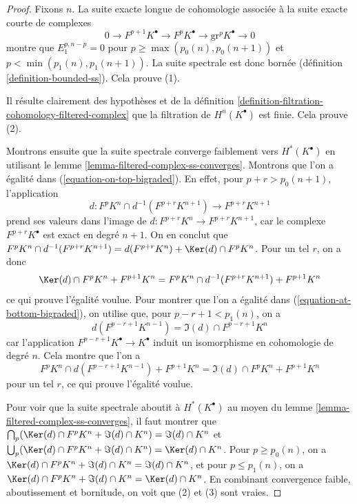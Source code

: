 \begin{proof}
Fixons $n$. La suite exacte longue de cohomologie associée à
la suite exacte courte de complexes
$$
0 \to F^{p + 1}K^\bullet \to F^pK^\bullet \to \text{gr}^pK^\bullet \to 0
$$
montre que $E_1^{p, n - p} = 0$ pour $p \geq \max(p_0(n), p_0(n + 1))$ et
$p < \min(p_1(n), p_1(n + 1))$. La suite spectrale est donc bornée
(définition \ref{definition-bounded-ss}). Cela prouve (1).

\medskip\noindent
Il résulte clairement des hypothèses et de la
définition \ref{definition-filtration-cohomology-filtered-complex}
que la filtration de $H^n(K^\bullet)$ est finie. Cela prouve (2).

\medskip\noindent
Montrons ensuite que la suite spectrale converge faiblement vers
$H^*(K^\bullet)$ en utilisant le
lemme \ref{lemma-filtered-complex-ss-converges}.
Montrons que l'on a égalité dans (\ref{equation-on-top-bigraded}).
En effet, pour $p + r > p_0(n + 1)$, l'application
$$
d : F^pK^{n} \cap d^{-1}(F^{p + r}K^{n + 1}) \to F^{p + r}K^{n + 1}
$$
prend ses valeurs dans l'image de $d : F^{p + r}K^n \to F^{p + r}K^{n + 1}$,
car le complexe $F^{p + r}K^\bullet$ est exact en degré $n + 1$.
On en conclut que $F^pK^{n} \cap d^{-1}(F^{p + r}K^{n + 1}) =
d(F^{p + r}K^n) + \Ker(d) \cap F^pK^n$. Pour un tel $r$, on a donc
$$
\Ker(d) \cap F^pK^{n} + F^{p + 1}K^{n} =
F^pK^{n} \cap d^{-1}(F^{p + r}K^{n + 1}) + F^{p + 1}K^{n}
$$
ce qui prouve l'égalité voulue. Pour montrer que l'on a égalité dans
(\ref{equation-at-bottom-bigraded}), on utilise que, pour $p - r + 1 < p_1(n)$,
on a
$$
d(F^{p - r + 1}K^{n - 1}) = \Im(d) \cap F^{p - r + 1}K^n
$$
car l'application $F^{p - r + 1}K^\bullet \to K^\bullet$ induit un
isomorphisme en cohomologie de degré $n$. Cela montre que
l'on a
$$
F^pK^{n} \cap d(F^{p - r + 1}K^{n - 1}) + F^{p + 1}K^{n} =
\Im(d) \cap F^pK^{n} + F^{p + 1}K^{n}
$$
pour un tel $r$, ce qui prouve l'égalité voulue.

\medskip\noindent
Pour voir que la suite spectrale aboutit à $H^*(K^\bullet)$ au moyen du
lemme \ref{lemma-filtered-complex-ss-converges}, il faut montrer que
$\bigcap_p (\Ker(d) \cap F^pK^n + \Im(d) \cap K^n) = \Im(d) \cap K^n$
et
$\bigcup_p (\Ker(d) \cap F^pK^n + \Im(d) \cap K^n) = \Ker(d) \cap K^n$.
Pour $p \geq p_0(n)$, on a
$\Ker(d) \cap F^pK^n + \Im(d) \cap K^n = \Im(d) \cap K^n$,
et pour $p \leq p_1(n)$, on a
$\Ker(d) \cap F^pK^n + \Im(d) \cap K^n = \Ker(d) \cap K^n$.
En combinant convergence faible, aboutissement et bornitude, on voit
que (2) et (3) sont vraies.
\end{proof}

